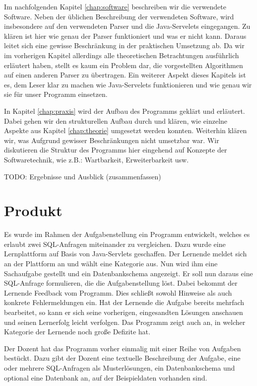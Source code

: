 Im nachfolgenden Kapitel \ref{chap:software} beschreiben wir die verwendete Software. Neben der üblichen Beschreibung der verwendeten Software, wird insbesondere auf den verwendeten Parser und die Java-Servelets eingegangen. Zu klären ist hier wie genau der Parser funktioniert und was er nicht kann. Daraus leitet sich eine gewisse Beschränkung in der praktischen Umsetzung ab. Da wir im vorherigen Kapitel allerdings alle theoretischen Betrachtungen ausführlich erläutert haben, stellt es kaum ein Problem dar, die vorgestellten Algorithmen auf einen anderen Parser zu übertragen. Ein weiterer Aspekt dieses Kapitels ist es, dem Leser klar zu machen wie Java-Servelets funktionieren und wie genau wir sie für unser Programm einsetzen.

In Kapitel \ref{chap:praxis} wird der Aufbau des Programms geklärt und erläutert. Dabei gehen wir den strukturellen Aufbau durch und klären, wie einzelne Aspekte aus Kapitel \ref{chap:theorie} umgesetzt werden konnten. Weiterhin klären wir, was Aufgrund gewisser Beschränkungen nicht umsetzbar war. Wir diskutieren die Struktur des Programms hier eingehend auf Konzepte der Softwaretechnik, wie z.B.: Wartbarkeit, Erweiterbarkeit usw.

TODO: Ergebnisse und Ausblick (zusammenfassen)


\section{Produkt}

Es wurde im Rahmen der Aufgabenstellung ein Programm entwickelt, welches es erlaubt zwei SQL-Anfragen miteinander zu vergleichen. Dazu wurde eine Lernplattform auf Basis von Java-Servlets geschaffen. Der Lernende meldet sich an der Plattform an und wählt eine Kategorie aus. Nun wird ihm eine Sachaufgabe gestellt und ein Datenbankschema angezeigt. Er soll nun daraus eine SQL-Anfrage formulieren, die die Aufgabenstellung löst. Dabei bekommt der Lernende Feedback vom Programm. Dies schließt sowohl Hinweise als auch konkrete Fehlermeldungen ein. Hat der Lernende die Aufgabe bereits mehrfach bearbeitet, so kann er sich seine vorherigen, eingesandten Lösungen anschauen und seinen Lernerfolg leicht verfolgen. Das Programm zeigt auch an, in welcher Kategorie der Lernende noch große Defizite hat.

Der Dozent hat das Programm vorher einmalig mit einer Reihe von Aufgaben bestückt. Dazu gibt der Dozent eine textuelle Beschreibung der Aufgabe, eine oder mehrere SQL-Anfragen als Musterlösungen, ein Datenbankschema und optional eine Datenbank an, auf der Beispieldaten vorhanden sind. 

